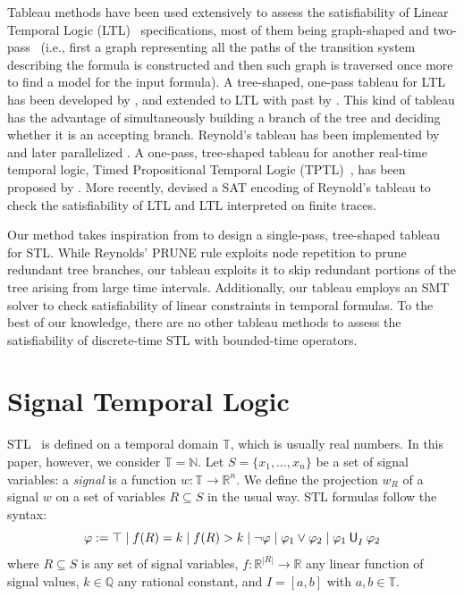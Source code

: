 \documentclass[acmsmall,screen]{acmart}
\begin{document}
Tableau methods have been used extensively to assess the satisfiability of Linear Temporal Logic (LTL)~\cite{Pnueli77} specifications, most of them being graph-shaped and two-pass~\cite{Wolp,Licht}
(i.e., first a graph representing all the paths of the transition system describing the formula is constructed and then such graph is traversed once more to find a model for the input formula).
A tree-shaped, one-pass tableau for LTL has been developed by \citet{Rey},
and extended to LTL with past by \citet{GiganteMR17}.
This kind of tableau has the advantage of simultaneously building a branch of the tree and deciding whether it is an accepting branch.
Reynold's tableau has been implemented by \citet{BertelloGMR16} and later parallelized \cite{McCabeDanstedR17}.
A one-pass, tree-shaped tableau for another real-time temporal logic,
Timed Propositional Temporal Logic (TPTL)~\cite{AlurH94}, has been proposed by \citet{GeattiGMR21}.
More recently, \citet{GeattiGMV24} devised a SAT encoding of Reynold's tableau to check the satisfiability of LTL and LTL interpreted on finite traces.

Our method takes inspiration from \citet{Rey} to design a single-pass, tree-shaped tableau for STL.
While Reynolds' \textsf{PRUNE} rule exploits node repetition to prune redundant tree branches,
our tableau exploits it to skip redundant portions of the tree arising from large time intervals.
Additionally, our tableau employs an SMT solver to check satisfiability of linear constraints in temporal formulas.
To the best of our knowledge, there are no other tableau methods to assess the satisfiability of discrete-time STL with bounded-time operators.


\section{Signal Temporal Logic}
\label{sec:stl}

STL~\cite{MalerN04} is defined on a temporal domain $\mathbb{T}$, which is usually real numbers.
In this paper, however, we consider $\mathbb{T} = \mathbb{N}$.
Let $S = \{ x_1, \dots, x_n \}$ be a set of signal variables:
a \emph{signal} is a function $w : \mathbb{T} \rightarrow \mathbb{R}^n$.
We define the projection $w_R$ of a signal $w$ on a set of variables $R \subseteq S$ in the usual way.
%
STL formulas follow the syntax:
\[
\varphi := \top \mid f(R) = k \mid f(R) > k \mid \neg \varphi \mid \varphi_1 \lor \varphi_2
  \mid \until{I}{\varphi_1}{\varphi_2}
\]
where $R \subseteq S$ is any set of signal variables,
$f : \mathbb{R}^{|R|} \rightarrow \mathbb{R}$ any linear function of signal values,
$k \in \mathbb{Q}$ any rational constant,
and $I = [a,b]$ with $a, b \in \mathbb{T}$.
\end{document}
